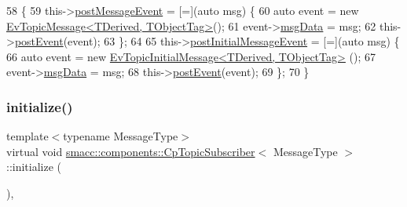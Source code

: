 \begin{DoxyCode}
58     \{
59         this->\hyperlink{classsmacc_1_1components_1_1CpTopicSubscriber_a002ca59f74f784f14597d1c0e057d298}{postMessageEvent} = [=](\textcolor{keyword}{auto} msg) \{
60             \textcolor{keyword}{auto} \textcolor{keyword}{event} = \textcolor{keyword}{new} \hyperlink{structsmacc_1_1default__events_1_1EvTopicMessage}{EvTopicMessage<TDerived, TObjectTag>}();
61             \textcolor{keyword}{event}->\hyperlink{structsmacc_1_1default__events_1_1EvTopicMessage_a82384568b702a0c3a3dc2fbe7eeefea9}{msgData} = msg;
62             this->\hyperlink{classsmacc_1_1ISmaccComponent_a84455564c2c4b90be58e900050232722}{postEvent}(event);
63         \};
64 
65         this->\hyperlink{classsmacc_1_1components_1_1CpTopicSubscriber_a9e1c210ebc8d5ef0c837e8bd9b83f754}{postInitialMessageEvent} = [=](\textcolor{keyword}{auto} msg) \{
66             \textcolor{keyword}{auto} \textcolor{keyword}{event} = \textcolor{keyword}{new} \hyperlink{structsmacc_1_1default__events_1_1EvTopicInitialMessage}{EvTopicInitialMessage<TDerived, TObjectTag>}
      ();
67             \textcolor{keyword}{event}->\hyperlink{structsmacc_1_1default__events_1_1EvTopicInitialMessage_a989c7cf4210c7750806b081bc73112cd}{msgData} = msg;
68             this->\hyperlink{classsmacc_1_1ISmaccComponent_a84455564c2c4b90be58e900050232722}{postEvent}(event);
69         \};
70     \}
\end{DoxyCode}
\mbox{\label{classsmacc_1_1components_1_1CpTopicSubscriber_a12a86f96d939cfa509181865d6ec85e9}} 
\subsubsection{\texorpdfstring{initialize()}{initialize()}}
{\footnotesize\ttfamily template$<$typename Message\+Type$>$ \\
virtual void \hyperlink{classsmacc_1_1components_1_1CpTopicSubscriber}{smacc\+::components\+::\+Cp\+Topic\+Subscriber}$<$ Message\+Type $>$\+::initialize (\begin{DoxyParamCaption}{ }\end{DoxyParamCaption})\hspace{0.3cm}{\ttfamily [inline]}, {\ttfamily [virtual]}}



